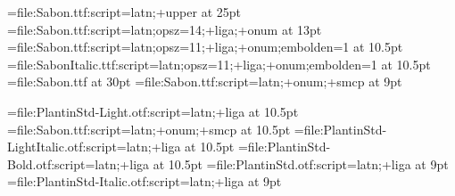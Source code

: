 \font\displayfont=file:Sabon.ttf:script=latn;+upper at 25pt
\font\headerfont=file:Sabon.ttf:script=latn;opsz=14;+liga;+onum at 13pt
\font\decorativfont=file:Sabon.ttf:script=latn;opsz=11;+liga;+onum;embolden=1 at 10.5pt
\font\itdecorativfont=file:SabonItalic.ttf:script=latn;opsz=11;+liga;+onum;embolden=1 at 10.5pt
\font{}=file:Sabon.ttf at 30pt
\font\smscshapefont=file:Sabon.ttf:script=latn;+onum;+smcp at 9pt

\font\regularfont=file:PlantinStd-Light.otf:script=latn;+liga at 10.5pt
\font\scshapefont=file:Sabon.ttf:script=latn;+onum;+smcp at 10.5pt
\font\italicfont=file:PlantinStd-LightItalic.otf:script=latn;+liga at 10.5pt
\font\boldfont=file:PlantinStd-Bold.otf:script=latn;+liga at 10.5pt
\font\frfont=file:PlantinStd.otf:script=latn;+liga at 9pt
\font\rubricfont=file:PlantinStd-Italic.otf:script=latn;+liga at 9pt

\def\display{\displayfont}
\def\header{\headerfont}
\def\decorativ{\decorativfont%
\def\it{\itdecorativfont}%
\def\rm{\decorativfont}}

\def\regular{\regularfont%
\def\it{\italicfont}%
\def\rm{\regularfont}%
\def\bf{\boldfont}%
\def\sc{\scshapefont}}

\def\small{\frfont%
\def\it{\rubricfont}%
\def\rm{\frfont}%
\def\sc{\smscshapefont}}

